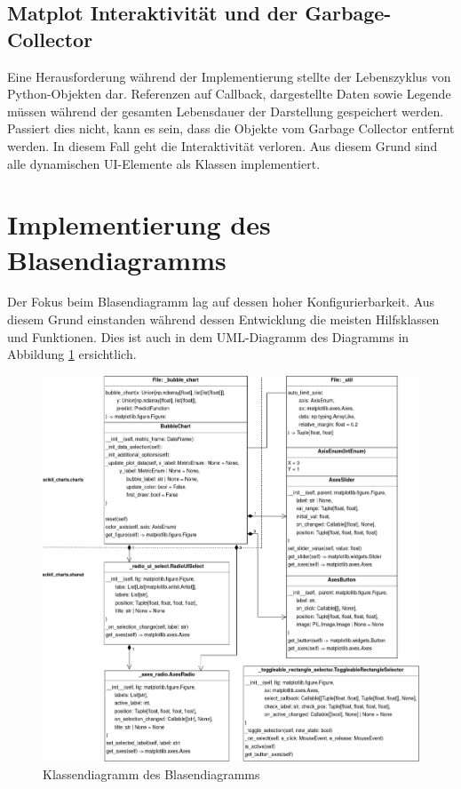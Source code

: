 \subsection{Matplot Interaktivität und der Garbage-Collector}
\label{subsec:impl_interact_problems}
\noindent Eine Herausforderung während der Implementierung stellte der Lebenszyklus von Python-Objekten dar. Referenzen auf Callback, dargestellte Daten sowie Legende müssen während der gesamten Lebensdauer der Darstellung gespeichert werden. Passiert dies nicht, kann es sein, dass die Objekte vom Garbage Collector entfernt werden. In diesem Fall geht die Interaktivität verloren. Aus diesem Grund sind alle dynamischen UI-Elemente als Klassen implementiert.

\pagebreak

\section{Implementierung des Blasendiagramms}
\label{sec:impl_bubble}

Der Fokus beim Blasendiagramm lag auf dessen hoher Konfigurierbarkeit. Aus diesem Grund einstanden während dessen Entwicklung die meisten Hilfsklassen und Funktionen. Dies ist auch in dem UML-Diagramm des Diagramms in Abbildung \ref{fig:uml_bubble} ersichtlich.

\begin{figure}[H]
    \centering
    \includegraphics[width=\textwidth]{images/uml_bubble_chart.png}
    \caption{Klassendiagramm des Blasendiagramms}
    \label{fig:uml_bubble}
\end{figure}

